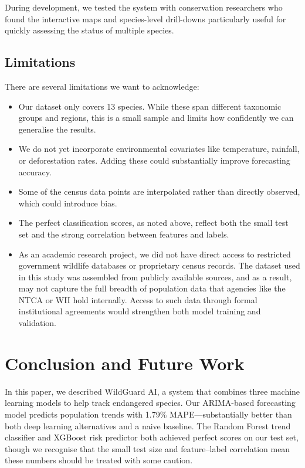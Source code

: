 \documentclass[conference]{IEEEtran}
\begin{document}
During development, we tested the system with conservation researchers who found the interactive maps and species-level drill-downs particularly useful for quickly assessing the status of multiple species.

\subsection{Limitations}
There are several limitations we want to acknowledge:
\begin{itemize}
\item Our dataset only covers 13 species. While these span different taxonomic groups and regions, this is a small sample and limits how confidently we can generalise the results.
\item We do not yet incorporate environmental covariates like temperature, rainfall, or deforestation rates. Adding these could substantially improve forecasting accuracy.
\item Some of the census data points are interpolated rather than directly observed, which could introduce bias.
\item The perfect classification scores, as noted above, reflect both the small test set and the strong correlation between features and labels.
\item As an academic research project, we did not have direct access to restricted government wildlife databases or proprietary census records. The dataset used in this study was assembled from publicly available sources, and as a result, may not capture the full breadth of population data that agencies like the NTCA or WII hold internally. Access to such data through formal institutional agreements would strengthen both model training and validation.
\end{itemize}

\section{Conclusion and Future Work}

In this paper, we described WildGuard AI, a system that combines three machine learning models to help track endangered species. Our ARIMA-based forecasting model predicts population trends with 1.79\% MAPE---substantially better than both deep learning alternatives and a naive baseline. The Random Forest trend classifier and XGBoost risk predictor both achieved perfect scores on our test set, though we recognise that the small test size and feature--label correlation mean these numbers should be treated with some caution.
\end{document}
